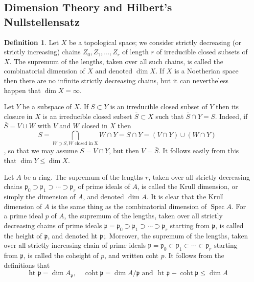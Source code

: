 \documentclass[a4paper,12pt]{article}
\theoremstyle{definition}
\newtheorem{defn}{Definition}[subsection]
\begin{document}
\newpage
\subsection{Dimension Theory and Hilbert's Nullstellensatz}
\begin{defn}
    Let $X$ be a topological space; we consider strictly decreasing (or strictly increasing) chains $Z_0, Z_1, \ldots, Z_r$ of length $r$ of irreducible closed subsets of $X$. The supremum of the lengths, taken over all such chains, is called the combinatorial dimension of $X$ and denoted $\operatorname{dim} X$. If $X$ is a Noetherian space then there are no infinite strictly decreasing chains, but it can nevertheless happen that $\operatorname{dim} X=\infty$.

    Let $Y$ be a subspace of $X$. If $S \subset Y$ is an irreducible closed subset of $Y$ then its closure in $X$ is an irreducible closed subset $\bar{S} \subset X$ such that $\bar{S} \cap Y=S$. Indeed, if $\bar{S}=V \cup W$ with $V$ and $W$ closed in $X$ then $$S=\bigcap_{W\supset S,W \text{ closed in X}}W\cap Y=\bar{S}\cap Y=(V \cap Y) \cup(W \cap Y)$$, so that we may assume $S=V \cap Y$, but then $V=\bar{S}$. It follows easily from this that $\operatorname{dim} Y \leqslant \operatorname{dim} X$.

    Let $A$ be a ring. The supremum of the lengths $r$, taken over all strictly decreasing chains $\mathfrak{p}_0 \supset \mathfrak{p}_1 \supset \cdots \supset \mathfrak{p}_r$ of prime ideals of $A$, is called the Krull dimension, or simply the dimension of $A$, and denoted $\operatorname{dim} A$. It is clear that the Krull dimension of $A$ is the same thing as the combinatorial dimension of $\operatorname{Spec} A$. For a prime ideal $p$ of $A$, the supremum of the lengths, taken over all strictly decreasing chains of prime ideals $\mathfrak{p}=\mathfrak{p}_0 \supset \mathfrak{p}_1 \supset \cdots \supset \mathfrak{p}_r$ starting from $\mathfrak{p}$, is called the height of $\mathfrak{p}$, and denoted ht $\mathfrak{p}$;. Moreover, the supremum of the lengths, taken over all strictly increasing chain of prime ideals $\mathfrak{p}=\mathfrak{p}_0 \subset \mathfrak{p}_1 \subset \cdots \subset \mathfrak{p}_r$ starting from $\mathfrak{p}$, is called the coheight of $p$, and written coht $p$. It follows from the definitions that
    $$
        \text { ht } \mathfrak{p}=\operatorname{dim} A_{\mathfrak{p}}, \quad \operatorname{coht} \mathfrak{p}=\operatorname{dim} A / \mathfrak{p} \text { and } \text { ht } \mathfrak{p}+\operatorname{coht} \mathfrak{p} \leqslant \operatorname{dim} A
    $$
\end{defn}
\end{document}

